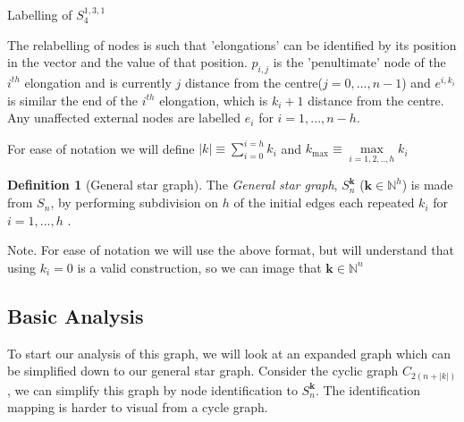 \documentclass[a4paper,10pt]{article}
\theoremstyle{definition}
\newtheorem{definition}[theorem]{Definition}
\theoremstyle{definition}
\theoremstyle{remark}
\theoremstyle{definition}
\begin{document}
\begin{myfigure}
\begin{center}
\end{center}
\caption{Labelling of $S^{1,3,1}_{4}$}
\end{myfigure}

The relabelling of nodes is such that 'elongations' can be identified by its position in the vector and the value of that position. $p_{i,j}$ is the 'penultimate' node of the $i^{th}$ elongation and is currently $j$ distance from the centre($j=0,...,n-1$) and $e^{i,k_{i}}$ is similar the end of the $i^{th}$ elongation, which is $k_{i}+1$ distance from the centre. Any unaffected external nodes are labelled $e_{i}$ for $i=1,...,n-h$.

For ease of notation we will define $ |k| \equiv \sum\limits_{i=0}^{i=h} k_{i}$ and $ k_{\max} \equiv \max\limits_{i=1,2,..,h} k_{i}$

\begin{definition}[General star graph]
The \textit{General star graph}, $S^{\bm{k}}_{n}$ ($\bm{k} \in \mathbb{N}^{h}$) is made from $S_{n}$, by performing subdivision on $h$ of the  initial edges each repeated $k_{i}$ for $i=1,...,h$ . 
\end{definition}

Note. For ease of notation we will use the above format, but will understand that using $k_{i}=0$ is a valid construction, so we can image that $\bm{k} \in \mathbb{N}^n$


\subsection{Basic Analysis}
To start our analysis of this graph, we will look at an expanded graph which can be simplified down to our general star graph. Consider the cyclic graph $C_{2(n+|k|)}$ , we can simplify this graph by node identification to $S^{\bm{k}}_{n}$. The identification mapping is harder to visual from a cycle graph.
\end{document}

